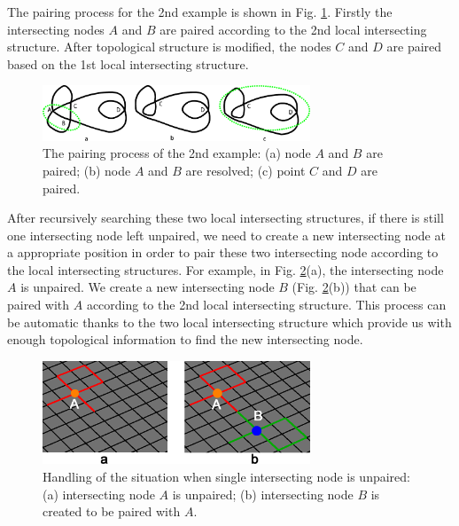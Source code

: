 \documentclass[final,5p,times,twocolumn]{elsarticle}
\begin{document}
The pairing process for the 2nd example is shown in Fig. \ref{fig:pair_int_exam2_proc}. Firstly the intersecting nodes $A$ and $B$ are paired according to the 2nd local intersecting structure. After topological structure is modified, the nodes $C$ and $D$ are paired based on the 1st local intersecting structure.

\begin{figure}[htbp]
\begin{center}
\includegraphics[width=8cm]{figures/pmexam2step.png}
\caption{The pairing process of the 2nd example: (a) node $A$ and $B$ are paired; (b) node $A$ and $B$ are resolved; (c) point $C$ and $D$ are paired.}
\label{fig:pair_int_exam2_proc}
\end{center}
\end{figure}

After recursively searching these two local intersecting structures, if there is still one intersecting node left unpaired, we need to create a new intersecting node at a appropriate position in order to pair these two intersecting node according to the local intersecting structures. For example, in Fig. \ref{fig:one_int_pt_left}(a), the intersecting node $A$ is unpaired. We create a new intersecting node $B$ (Fig. \ref{fig:one_int_pt_left}(b)) that can be paired with $A$ according to the 2nd local intersecting structure. This process can be automatic thanks to the two local intersecting structure which provide us with enough topological information to find the new intersecting node.

\begin{figure}[htbp]
\begin{center}
\includegraphics[width=8cm]{figures/one_int_pt_left.png}
\caption{Handling of the situation when single intersecting node is unpaired: (a) intersecting node $A$ is unpaired; (b) intersecting node $B$ is created to be paired with $A$.}
\label{fig:one_int_pt_left}
\end{center}
\end{figure}
\end{document}
